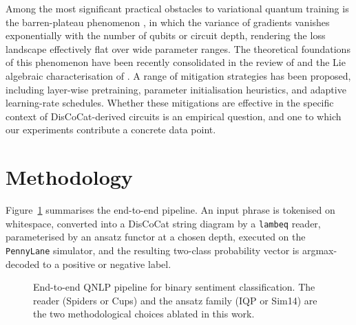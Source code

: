 \documentclass[11pt, a4paper]{article}
\begin{document}
Among the most significant practical obstacles to variational quantum
training is the barren-plateau phenomenon \citep{mcclean2018},
in which the variance of gradients vanishes exponentially with the
number of qubits or circuit depth, rendering the loss landscape
effectively flat over wide parameter ranges. The theoretical
foundations of this phenomenon have been recently consolidated in the
review of \citet{larocca2025} and the Lie algebraic characterisation
of \citet{ragone2024}. A range of mitigation strategies has been
proposed, including layer-wise pretraining, parameter initialisation
heuristics, and adaptive learning-rate schedules. Whether these
mitigations are effective in the specific context of DisCoCat-derived
circuits is an empirical question, and one to which our experiments
contribute a concrete data point.

\section{Methodology}
\label{sec:method}

Figure~\ref{fig:pipeline} summarises the end-to-end pipeline. An input
phrase is tokenised on whitespace, converted into a DisCoCat string
diagram by a \texttt{lambeq} reader, parameterised by an ansatz functor
at a chosen depth, executed on the \texttt{PennyLane} simulator, and
the resulting two-class probability vector is argmax-decoded to a
positive or negative label.

\begin{figure}[h!]
\centering
{}
\caption{End-to-end QNLP pipeline for binary sentiment classification.
The reader (Spiders or Cups) and the ansatz family (IQP or Sim14) are
the two methodological choices ablated in this work.}
\label{fig:pipeline}
\end{figure}
\end{document}
